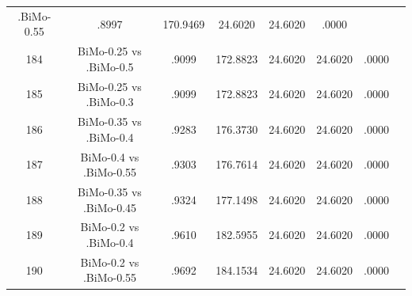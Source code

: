 \documentclass[a4paper,10pt]{article}
\begin{document}
\begin{landscape}
\begin{table}[!htp]
\begin{tabular}{cccccccc}
.BiMo-0.55&.8997&170.9469&24.6020&24.6020&.0000\\184&BiMo-0.25 vs .BiMo-0.5&.9099&172.8823&24.6020&24.6020&.0000\\185&BiMo-0.25 vs .BiMo-0.3&.9099&172.8823&24.6020&24.6020&.0000\\186&BiMo-0.35 vs .BiMo-0.4&.9283&176.3730&24.6020&24.6020&.0000\\187&BiMo-0.4 vs .BiMo-0.55&.9303&176.7614&24.6020&24.6020&.0000\\188&BiMo-0.35 vs .BiMo-0.45&.9324&177.1498&24.6020&24.6020&.0000\\189&BiMo-0.2 vs .BiMo-0.4&.9610&182.5955&24.6020&24.6020&.0000\\190&BiMo-0.2 vs .BiMo-0.55&.9692&184.1534&24.6020&24.6020&.0000\\\hline
\end{tabular}
\end{table}

\end{landscape}
\end{document}
